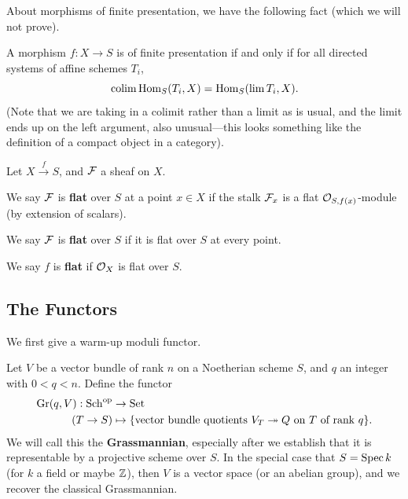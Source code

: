 \documentclass[12pt]{article}
\DeclareMathOperator{\Gr}{Gr}
\begin{document}
About morphisms of finite presentation, we have the following fact (which we will not prove).
\begin{thm}
    A morphism $f:X\to S$ is of finite presentation if and only if for all directed systems of affine schemes $T_i$,
    \[\operatorname{colim}\mathrm{Hom}_S(T_i,X) = \mathrm{Hom}_S(\lim T_i, X).\]
    (Note that we are taking in a colimit rather than a limit as is usual, and the limit ends up on the left argument, also unusual---this looks something like the definition of a compact object in a category).
\end{thm}

\begin{defn}
    Let $X\xrightarrow{f} S$, and $\mathcal{F}$ a sheaf on $X$.
    
    We say $\mathcal{F}$ is \textbf{flat} over $S$ at a point $x\in X$ if the stalk $\mathcal{F}_x$ is a flat $\mathcal{O}_{S,f(x)}$-module (by extension of scalars).

    We say $\mathcal{F}$ is \textbf{flat} over $S$ if it is flat over $S$ at every point.

    We say $f$ is \textbf{flat} if $\mathcal{O}_X$ is flat over $S$.
\end{defn}


\subsection{The Functors}

We first give a warm-up moduli functor.

\begin{defn}
    Let $V$ be a vector bundle of rank $n$ on a Noetherian scheme $S$, and $q$ an integer with $0<q<n$. Define the functor
    \begin{align*}
        \Gr(q,V): \Sch^\op &\to \Set\\
        (T\to S) &\mapsto \{\text{vector bundle quotients $V_T\twoheadrightarrow Q$ on $T$ of rank $q$}\}.
    \end{align*}
    We will call this the \textbf{Grassmannian}, especially after we establish that it is representable by a projective scheme over $S$. In the special case that $S=\operatorname{Spec} k$ (for $k$ a field or maybe $\mathbb{Z}$), then $V$ is a vector space (or an abelian group), and we recover the classical Grassmannian.
\end{defn}
\end{document}
